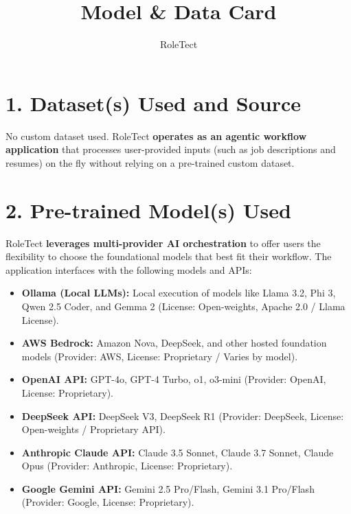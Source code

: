 \documentclass[11pt, a4paper]{article}
\title{\textbf{Model \& Data Card}}
\author{RoleTect}
\date{}
\begin{document}
\maketitle
\thispagestyle{empty} %

\section*{1. Dataset(s) Used and Source}
No custom dataset used. RoleTect \textbf{operates as an agentic workflow application} that processes user-provided inputs (such as job descriptions and resumes) on the fly without relying on a pre-trained custom dataset.

\section*{2. Pre-trained Model(s) Used}
RoleTect \textbf{leverages multi-provider AI orchestration} to offer users the flexibility to choose the foundational models that best fit their workflow. The application interfaces with the following models and APIs:

\begin{itemize}
    \item \textbf{Ollama (Local LLMs):} Local execution of models like Llama 3.2, Phi 3, Qwen 2.5 Coder, and Gemma 2 (License: Open-weights, Apache 2.0 / Llama License).
    \item \textbf{AWS Bedrock:} Amazon Nova, DeepSeek, and other hosted foundation models (Provider: AWS, License: Proprietary / Varies by model).
    \item \textbf{OpenAI API:} GPT-4o, GPT-4 Turbo, o1, o3-mini (Provider: OpenAI, License: Proprietary).
    \item \textbf{DeepSeek API:} DeepSeek V3, DeepSeek R1 (Provider: DeepSeek, License: Open-weights / Proprietary API).
    \item \textbf{Anthropic Claude API:} Claude 3.5 Sonnet, Claude 3.7 Sonnet, Claude Opus (Provider: Anthropic, License: Proprietary).
    \item \textbf{Google Gemini API:} Gemini 2.5 Pro/Flash, Gemini 3.1 Pro/Flash (Provider: Google, License: Proprietary).
\end{itemize}
\end{document}
